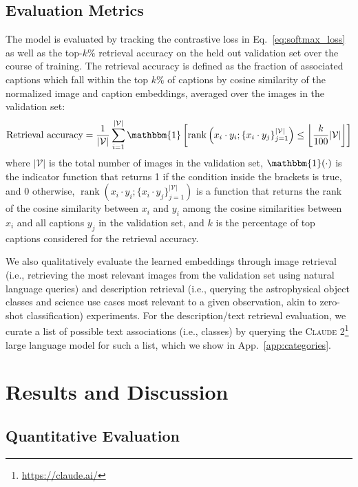 \documentclass[10pt]{article} %
\begin{document}
\subsection{Evaluation Metrics}
\label{sec:eval}

The model is evaluated by tracking the contrastive loss in Eq.~\ref{eq:softmax_loss} as well as the top-$k\%$ retrieval accuracy on the held out validation set over the course of training.
%
The retrieval accuracy is defined as the fraction of associated captions which fall within the top $k\%$ of captions by cosine similarity of the normalized image and caption embeddings, averaged over the images in the validation set:
\begin{equation}
\text{Retrieval accuracy} = \frac{1}{|\mathcal V|} \sum_{i=1}^{|\mathcal V|} \mathbbm{1}\left[\operatorname{rank}\left({x}_i \cdot {y}_{i}; \{{x}_i \cdot {y}_{j}\}_{j=1}^{|\mathcal V|}\right) \leq \left\lfloor\frac{k}{100}|\mathcal V|\right\rfloor\right]
\label{eq:retrieval_accuracy}
\end{equation}
where $|\mathcal V|$ is the total number of images in the validation set, $\mathbbm{1}(\cdot)$ is the indicator function that returns 1 if the condition inside the brackets is true, and 0 otherwise, $\operatorname{rank}\left({x}_i \cdot {y}_{i}; \{{x}_i \cdot {y}_{j}\}_{j=1}^{|\mathcal V|}\right)$ is a function that returns the rank of the cosine similarity between ${x}_i$ and ${y}_{i}$ among the cosine similarities between ${x}_i$ and all captions ${y}_j$ in the validation set, and $k$ is the percentage of top captions considered for the retrieval accuracy.

We also qualitatively evaluate the learned embeddings through image retrieval (i.e., retrieving the most relevant images from the validation set using natural language queries) and description retrieval (i.e., querying the astrophysical object classes and science use cases most relevant to a given observation, akin to zero-shot classification) experiments. 
%
For the description/text retrieval evaluation, we curate a list of possible text associations (i.e., classes) by querying the \textsc{Claude 2}\footnote{\url{https://claude.ai/}} large language model for such a list, which we show in App.~\ref{app:categories}.

\section{Results and Discussion}
\label{sec:results}

\subsection{Quantitative Evaluation}
\end{document}
